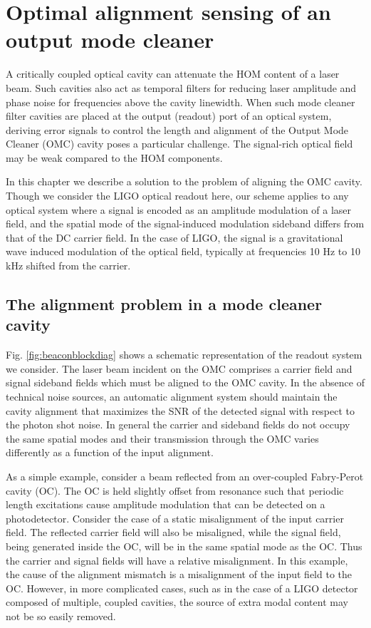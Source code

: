 \chapter{Optimal alignment sensing of an output mode cleaner}

A critically coupled optical cavity can attenuate the HOM content of a laser beam. %
Such cavities also act as temporal filters for reducing laser amplitude and phase noise for frequencies above the cavity linewidth. %
When such mode cleaner filter cavities are placed at the output (readout) port of an optical system, deriving error signals to control the length and alignment of the Output Mode Cleaner (OMC) cavity poses a particular challenge. %
The signal-rich optical field may be weak compared to the HOM components. %


In this chapter we describe a solution to the problem of aligning the OMC cavity. %
Though we consider the LIGO optical readout here, our scheme applies to any optical system where a signal is encoded as an amplitude modulation of a laser field, and the spatial mode of the signal-induced modulation sideband differs from that of the DC carrier field. %
 In the case of LIGO, the signal is a gravitational wave induced modulation of the optical field, typically at frequencies 10 Hz to 10 kHz shifted from the carrier. %


\section{The alignment problem in a mode cleaner cavity}
%
Fig. %
\ref{fig:beaconblockdiag} shows a schematic representation of the readout system we consider. %
The laser beam incident on the OMC comprises a carrier field and signal sideband fields which must be aligned to the OMC cavity. %
In the absence of technical noise sources, an automatic alignment system should maintain the cavity alignment that maximizes the SNR of the detected signal with respect to the photon shot noise. %
In general the carrier and sideband fields do not occupy the same spatial modes and their transmission through the OMC varies differently as a function of the input alignment. %


As a simple example, consider a beam reflected from an over-coupled Fabry-Perot cavity (OC). %
The OC is held slightly offset from resonance such that periodic length excitations cause amplitude modulation that can be detected on a photodetector. %
Consider the case of a static misalignment of the input carrier field. %
The reflected carrier field will also be misaligned, while the signal field, being generated inside the OC, will be in the same spatial mode as the OC. %
Thus the carrier and signal fields will have a relative misalignment. %
In this example, the cause of the alignment mismatch is a misalignment of the input field to the OC. %
However, in more complicated cases, such as in the case of a LIGO detector composed of multiple, coupled cavities, the source of extra modal content may not be so easily removed.

